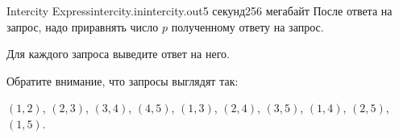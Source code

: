 \begin{problem}{Intercity Express}{intercity.in}{intercity.out}{5 секунд}{256 мегабайт}
После ответа на запрос, надо приравнять число $p$ полученному ответу на запрос.

\OutputFile
Для каждого запроса выведите ответ на него.

\Examples

\begin{example}
%
\end{example}

\Note

Обратите внимание, что запросы выглядят так:  

$(1, 2)$, $(2, 3)$, $(3, 4)$, $(4, 5)$, $(1, 3)$, $(2, 4)$, $(3, 5)$, $(1, 4)$, $(2, 5)$, $(1, 5)$.


\end{problem}
